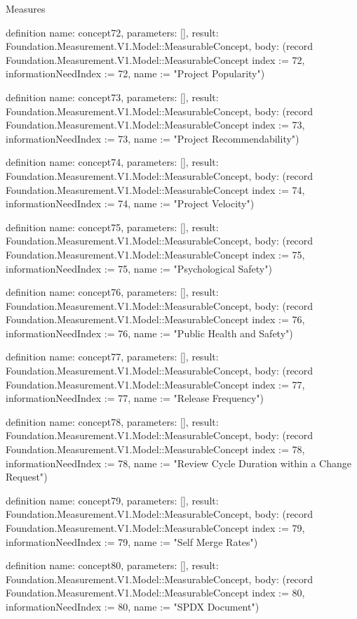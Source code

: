 \begin{lexlean}{Measures}
\begin{semanticmodule}
definition{
  name: concept72,
  parameters: [],
  result: Foundation.Measurement.V1.Model::MeasurableConcept,
  body: (record Foundation.Measurement.V1.Model::MeasurableConcept {index := 72, informationNeedIndex := 72, name := "Project Popularity"})
}

definition{
  name: concept73,
  parameters: [],
  result: Foundation.Measurement.V1.Model::MeasurableConcept,
  body: (record Foundation.Measurement.V1.Model::MeasurableConcept {index := 73, informationNeedIndex := 73, name := "Project Recommendability"})
}

definition{
  name: concept74,
  parameters: [],
  result: Foundation.Measurement.V1.Model::MeasurableConcept,
  body: (record Foundation.Measurement.V1.Model::MeasurableConcept {index := 74, informationNeedIndex := 74, name := "Project Velocity"})
}

definition{
  name: concept75,
  parameters: [],
  result: Foundation.Measurement.V1.Model::MeasurableConcept,
  body: (record Foundation.Measurement.V1.Model::MeasurableConcept {index := 75, informationNeedIndex := 75, name := "Psychological Safety"})
}

definition{
  name: concept76,
  parameters: [],
  result: Foundation.Measurement.V1.Model::MeasurableConcept,
  body: (record Foundation.Measurement.V1.Model::MeasurableConcept {index := 76, informationNeedIndex := 76, name := "Public Health and Safety"})
}

definition{
  name: concept77,
  parameters: [],
  result: Foundation.Measurement.V1.Model::MeasurableConcept,
  body: (record Foundation.Measurement.V1.Model::MeasurableConcept {index := 77, informationNeedIndex := 77, name := "Release Frequency"})
}

definition{
  name: concept78,
  parameters: [],
  result: Foundation.Measurement.V1.Model::MeasurableConcept,
  body: (record Foundation.Measurement.V1.Model::MeasurableConcept {index := 78, informationNeedIndex := 78, name := "Review Cycle Duration within a Change Request"})
}

definition{
  name: concept79,
  parameters: [],
  result: Foundation.Measurement.V1.Model::MeasurableConcept,
  body: (record Foundation.Measurement.V1.Model::MeasurableConcept {index := 79, informationNeedIndex := 79, name := "Self Merge Rates"})
}

definition{
  name: concept80,
  parameters: [],
  result: Foundation.Measurement.V1.Model::MeasurableConcept,
  body: (record Foundation.Measurement.V1.Model::MeasurableConcept {index := 80, informationNeedIndex := 80, name := "SPDX Document"})
}


\end{semanticmodule}
\end{lexlean}
